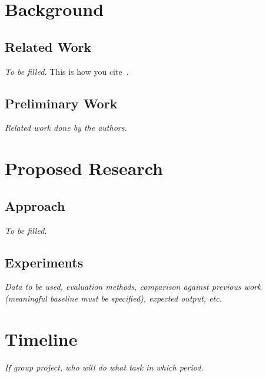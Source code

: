 \documentclass[10pt]{article}
\begin{document}
\section{Background}

\subsection{Related Work}

\textit{To be filled.}
This is how you cite~\cite{choi:16a}.

\subsection{Preliminary Work}

\textit{Related work done by the authors.}



\section{Proposed Research}

\subsection{Approach}

\textit{To be filled.}

\subsection{Experiments}

\textit{Data to be used, evaluation methods, comparison against previous work (meaningful baseline must be specified), expected output, etc.}

\section{Timeline}

\textit{If group project, who will do what task in which period.}




\end{document}
